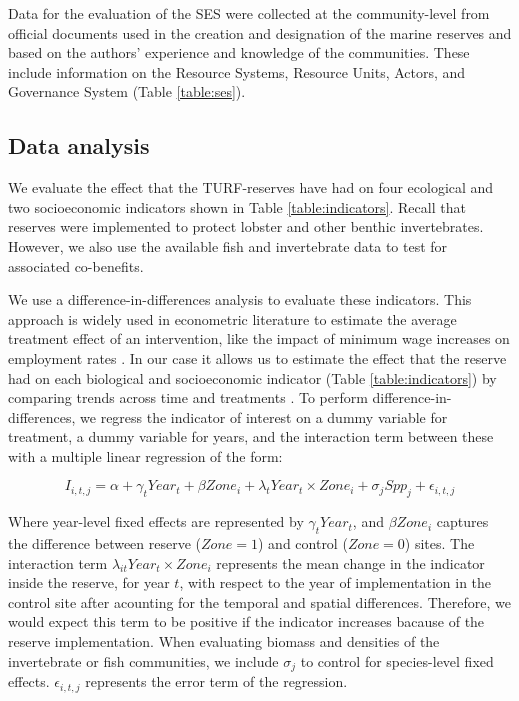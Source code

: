 \documentclass{frontiersSCNS}
\begin{document}
Data for the evaluation of the SES were collected at the community-level
from official documents used in the creation and designation of the
marine reserves
\citep{dof_website_2012,dof_website_2013,dof_website_2018} and based on
the authors' experience and knowledge of the communities. These include
information on the Resource Systems, Resource Units, Actors, and
Governance System (Table \ref{table:ses}).

\hypertarget{data-analysis}{%
\subsection{Data analysis}\label{data-analysis}}

We evaluate the effect that the TURF-reserves have had on four
ecological and two socioeconomic indicators shown in Table
\ref{table:indicators}. Recall that reserves were implemented to protect
lobster and other benthic invertebrates. However, we also use the
available fish and invertebrate data to test for associated co-benefits.

We use a difference-in-differences analysis to evaluate these
indicators. This approach is widely used in econometric literature to
estimate the average treatment effect of an intervention, like the
impact of minimum wage increases on employment rates \citep{card_1994}.
In our case it allows us to estimate the effect that the reserve had on
each biological and socioeconomic indicator (Table
\ref{table:indicators}) by comparing trends across time and treatments
\citep{moland_2013,Villasenor-Derbez_2018}. To perform
difference-in-differences, we regress the indicator of interest on a
dummy variable for treatment, a dummy variable for years, and the
interaction term between these with a multiple linear regression of the
form:

\begin{equation}
I_{i,t,j} = \alpha + \gamma_{t} Year_t + \beta Zone_i + \lambda_{t} Year_t\times Zone_i + \sigma_jSpp_j + \epsilon_{i,t,j}
\label{eqn:reg_bio}
\end{equation}

Where year-level fixed effects are represented by \(\gamma_t Year_t\),
and \(\beta Zone_i\) captures the difference between reserve
(\(Zone = 1\)) and control (\(Zone = 0\)) sites. The interaction term
\(\lambda_{it} Year_t\times Zone_i\) represents the mean change in the
indicator inside the reserve, for year \(t\), with respect to the year
of implementation in the control site after acounting for the temporal
and spatial differences. Therefore, we would expect this term to be
positive if the indicator increases bacause of the reserve
implementation. When evaluating biomass and densities of the
invertebrate or fish communities, we include \(\sigma_j\) to control for
species-level fixed effects. \(\epsilon_{i,t,j}\) represents the error
term of the regression.
\end{document}
